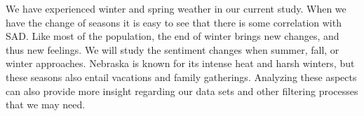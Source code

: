 We have experienced winter and spring weather in our current study. When we have the change of seasons it is easy to see that there is some correlation with SAD. Like most of the population, the end of winter brings new changes, and thus new feelings. We will study the sentiment changes when summer, fall, or winter approaches. Nebraska is known for its intense heat and harsh winters, but these seasons also entail vacations and family gatherings. Analyzing these aspects can also provide more insight regarding our data sets and other filtering processes that we may need.
